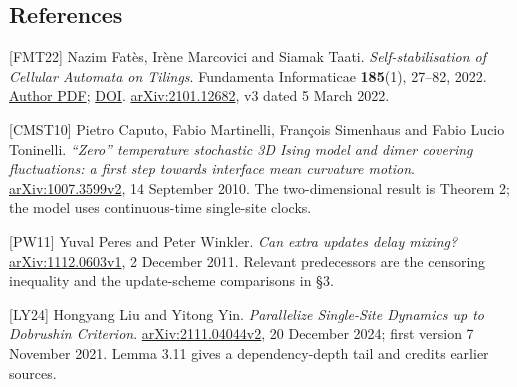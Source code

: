\documentclass[
  11pt,
  a4paper,
]{article}
\begin{document}
\subsection{References}\label{references}

{[}FMT22{]} Nazim Fatès, Irène Marcovici and Siamak Taati.
\emph{Self-stabilisation of Cellular Automata on Tilings}. Fundamenta
Informaticae \textbf{185}(1), 27--82, 2022.
\href{https://marcovici.perso.math.cnrs.fr/Publications/Fates_Marcovici_Taati_FI2022.pdf}{Author
PDF}; \href{https://doi.org/10.3233/FI-222103}{DOI}.
\href{https://arxiv.org/abs/2101.12682}{arXiv:2101.12682}, v3 dated 5
March 2022.

{[}CMST10{]} Pietro Caputo, Fabio Martinelli, François Simenhaus and
Fabio Lucio Toninelli. \emph{``Zero'' temperature stochastic 3D Ising
model and dimer covering fluctuations: a first step towards interface
mean curvature motion}.
\href{https://arxiv.org/html/1007.3599v2}{arXiv:1007.3599v2}, 14
September 2010. The two-dimensional result is Theorem 2; the model uses
continuous-time single-site clocks.

{[}PW11{]} Yuval Peres and Peter Winkler. \emph{Can extra updates delay
mixing?} \href{https://arxiv.org/html/1112.0603v1}{arXiv:1112.0603v1}, 2
December 2011. Relevant predecessors are the censoring inequality and
the update-scheme comparisons in §3.

{[}LY24{]} Hongyang Liu and Yitong Yin. \emph{Parallelize Single-Site
Dynamics up to Dobrushin Criterion}.
\href{https://arxiv.org/html/2111.04044v2}{arXiv:2111.04044v2}, 20
December 2024; first version 7 November 2021. Lemma 3.11 gives a
dependency-depth tail and credits earlier sources.
\end{document}
